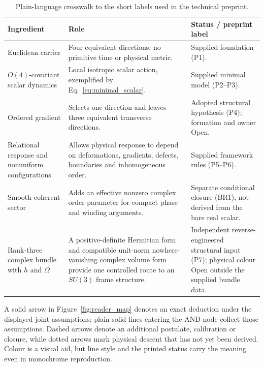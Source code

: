 \documentclass[11pt,a4paper]{article}
\begin{document}
\begin{table}[H]
\centering
\small
\begin{tabularx}{\textwidth}{@{}>{\raggedright\arraybackslash}p{3.1cm}Y>{\raggedright\arraybackslash}p{3.3cm}@{}}
\toprule
\textbf{Ingredient} & \textbf{Role} & \textbf{Status / preprint label}\\
\midrule
Euclidean carrier & Four equivalent directions; no primitive time or physical metric. & Supplied foundation (P1).\\
$O(4)$-covariant scalar dynamics & Local isotropic scalar action, exemplified by Eq.~\eqref{eq:minimal_scalar}. & Supplied minimal model (P2--P3).\\
Ordered gradient & Selects one direction and leaves three equivalent transverse directions. & Adopted structural hypothesis (P4); formation and owner Open.\\
Relational response and nonuniform configurations & Allows physical response to depend on deformations, gradients, defects, boundaries and inhomogeneous order. & Supplied framework rules (P5--P6).\\
Smooth coherent sector & Adds an effective nonzero complex order parameter for compact phase and winding arguments. & Separate conditional closure (BR1), not derived from the bare real scalar.\\
Rank-three complex bundle with $h$ and $\Omega$ & A positive-definite Hermitian form and compatible unit-norm nowhere-vanishing complex volume form provide one controlled route to an $SU(3)$ frame structure. & Independent reverse-engineered structural input (P7); physical colour Open outside the supplied bundle data.\\
\bottomrule
\end{tabularx}
\caption{Plain-language crosswalk to the short labels used in the technical preprint.}
\label{tab:ingredient_crosswalk}
\end{table}

A solid arrow in Figure~\ref{fig:reader_map} denotes an exact deduction under
the displayed joint assumptions; plain solid lines entering the AND node
collect those assumptions.  Dashed arrows denote an additional postulate,
calibration or closure, while dotted arrows mark physical descent that has not
yet been derived.  Colour is a visual aid, but line style and the printed
status carry the meaning even in monochrome reproduction.
\end{document}
